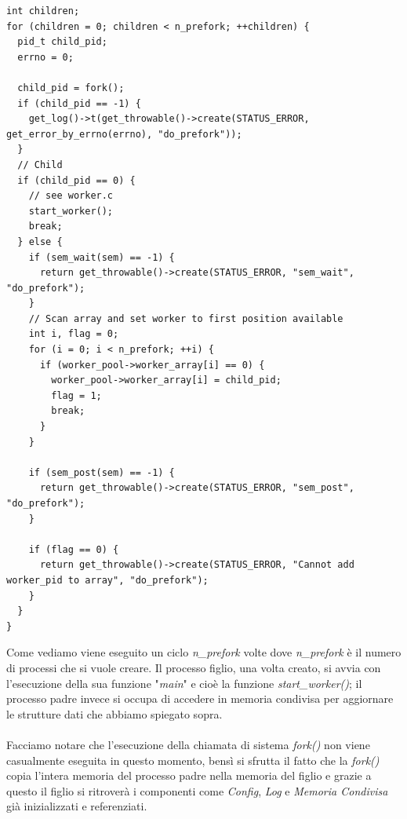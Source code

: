 \documentclass[italian]{tktltiki2}
\begin{document}
\begin{lstlisting}
int children;
for (children = 0; children < n_prefork; ++children) {
  pid_t child_pid;
  errno = 0;

  child_pid = fork();
  if (child_pid == -1) {
    get_log()->t(get_throwable()->create(STATUS_ERROR, get_error_by_errno(errno), "do_prefork"));
  }
  // Child 
  if (child_pid == 0) {
    // see worker.c
    start_worker();
    break;
  } else {
    if (sem_wait(sem) == -1) {
      return get_throwable()->create(STATUS_ERROR, "sem_wait", "do_prefork");
    }
    // Scan array and set worker to first position available
    int i, flag = 0;
    for (i = 0; i < n_prefork; ++i) {
      if (worker_pool->worker_array[i] == 0) {
        worker_pool->worker_array[i] = child_pid;
        flag = 1;
        break;
      }
    }

    if (sem_post(sem) == -1) {
      return get_throwable()->create(STATUS_ERROR, "sem_post", "do_prefork");
    }

    if (flag == 0) {
      return get_throwable()->create(STATUS_ERROR, "Cannot add worker_pid to array", "do_prefork");        
    }            
  }
}
\end{lstlisting}
Come vediamo viene eseguito un ciclo \emph{n\_prefork} volte dove \emph{n\_prefork} è il numero di processi che si vuole creare. Il processo figlio, una volta creato, si avvia con l'esecuzione della sua funzione "\emph{main}" e cioè la funzione \emph{start\_worker()}; il processo padre invece si occupa di accedere in memoria condivisa per aggiornare le strutture dati che abbiamo spiegato sopra. \\\\Facciamo notare che l'esecuzione della chiamata di sistema \emph{fork()} non viene casualmente eseguita in questo momento, bensì si sfrutta il fatto che la \emph{fork()} copia l'intera memoria del processo padre nella memoria del figlio e grazie a questo il figlio si ritroverà i componenti come \emph{Config}, \emph{Log} e \emph{Memoria Condivisa} già inizializzati e referenziati.
\end{document}
